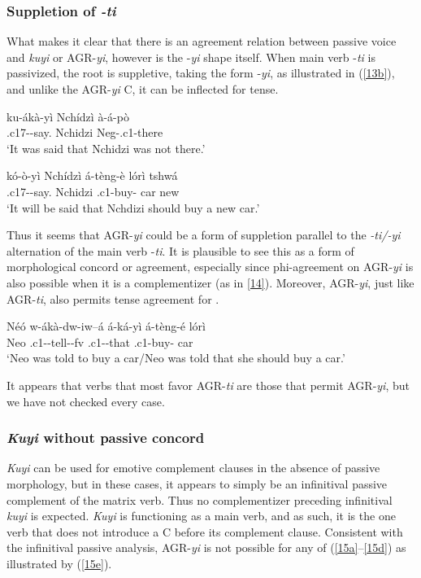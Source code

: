 \documentclass[output=paper,
modfonts
]{langscibook}
\begin{document}
\subsubsection{Suppletion of \textit{-ti}}

What makes it clear that there is an agreement relation between passive voice and \textit{kuyi} or AGR-\textit{yi}, however is the -\textit{yi} shape itself. When main verb -\textit{ti} is passivized, the root is suppletive, taking the form -\textit{yi}, as illustrated in (\ref{13b}), and unlike the AGR-\textit{yi} C, it can be inflected for tense.

\ea
\ea \gll ku-ákà-yì Nchídzì à-á-pò\\
	.c17--say. Nchidzi	Neg-.c1-there\\
	\glt `It was said that Nchidzi was not there.'

\ex \label{13b} \gll kó-ò-yì Nchídzì	á-tèng-è lórì tshwá\\
	.c17--say.	Nchidzi	.c1-buy-	car	new\\
     \glt `It will be said that Nchdizi should buy a new car.' \z \z

Thus it seems that AGR-\textit{yi} could be a form of suppletion parallel to the \textit{-ti/-yi} alternation of the main verb -\textit{ti}. It is plausible to see this as a form of morphological concord or agreement, especially since phi-agreement on AGR-\textit{yi} is also possible when it is a complementizer (as in \ref{14}). Moreover, AGR-\textit{yi}, just like AGR-\textit{ti}, also permits tense agreement for .  

\ea\label{14} \gll Néó	w-ákà-dw-iw–á á-ká-yì á-tèng-é lórì\\
	Neo	.c1--tell--fv  .c1--that .c1-buy-	car\\
	\glt `Neo was told to buy a car\slash Neo was told that she should buy a car.' \z

It appears that verbs that most favor AGR-\textit{ti} are those that permit AGR-\textit{yi}, but we have not checked every case.

\subsubsection{\textit{Kuyi} without passive concord}

\textit{Kuyi} can be used for emotive complement clauses in the absence of passive morphology, but in these cases, it appears to simply be an infinitival passive complement of the matrix verb. Thus no complementizer preceding infinitival \textit{kuyi} is expected. \textit{Kuyi} is functioning as a main verb, and as such, it is the one verb that does not introduce a C before its complement clause. Consistent with the infinitival passive analysis, AGR-\textit{yi} is not possible for any of (\ref{15a}--\ref{15d}) as illustrated by (\ref{15e}). %
\end{document}

